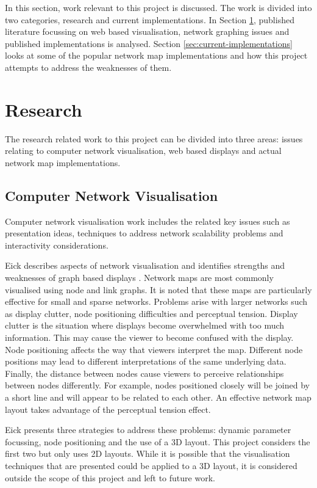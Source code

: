 \documentclass[11pt, a4paper]{report}
\begin{document}
In this section, work relevant to this project is discussed. The work is divided
into two categories, research and current implementations. In Section
\ref{sec:research}, published literature focussing on web based visualisation,
network graphing issues and published implementations is analysed. Section
\ref{sec:current-implementations} looks at some of the popular network map
implementations and how this project attempts to address the weaknesses of them.

\section{Research}
\label{sec:research}

The research related work to this project can be divided into three areas:
issues relating to computer network visualisation, web based displays and actual
network map implementations. 

\subsection{Computer Network Visualisation}
\label{sec:computer-network-vis}

Computer network visualisation work includes the related key issues such as
presentation ideas, techniques to address network scalability problems and
interactivity considerations.

Eick describes aspects of network visualisation and identifies strengths and
weaknesses of graph based displays \cite{Eick_1996}. Network maps are most
commonly visualised using node and link graphs. It is noted that these maps are
particularly effective for small and sparse networks. Problems arise with larger
networks such as display clutter, node positioning difficulties and perceptual
tension. Display clutter is the situation where displays become overwhelmed with
too much information. This may cause the viewer to become confused with the
display. Node positioning affects the way that viewers interpret the map.
Different node positions may lead to different interpretations of the same
underlying data. Finally, the distance between nodes cause viewers to perceive
relationships between nodes differently. For example, nodes positioned closely
will be joined by a short line and will appear to be related to each other. An
effective network map layout takes advantage of the perceptual tension effect.

Eick presents three strategies to address these problems: dynamic
parameter focussing, node positioning and the use of a 3D layout. This project
considers the first two but only uses 2D layouts. While it is possible that the
visualisation techniques that are presented could be applied to a 3D layout, it
is considered outside the scope of this project and left to future work.
\end{document}
